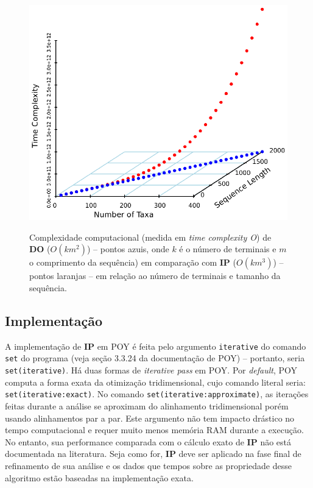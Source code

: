 \begin{refsection}
  \begin{figure}[H]
       \centering
      {\includegraphics[scale=0.9]{figures/tut11/complexity.eps}}
	{\caption[Complexidade computacional de \textbf{DO} em comparação com \textbf{IP}.]{Complexidade computacional (medida em \textit{time complexity O}) de \textbf{DO} ($O(km^2)$) -- pontos azuis, onde $k$ é o número de terminais e $m$ o comprimento da sequência) em comparação com \textbf{IP} ($O(km^3)$) -- pontos laranjas -- em relação ao número de terminais e tamanho da sequência.}\label{tut11:fig:complexity}}
  \end{figure}



\subsection{Implementação}\label{tut11:ip:implementation}

A implementação de \textbf{IP} em POY é feita pelo argumento \texttt{iterative} do comando \texttt{set} do programa (veja seção 3.3.24 da documentação de POY) -- portanto, seria \texttt{set(iterative)}. Há duas formas de \textit{iterative pass} em POY. Por \textit{default}, POY computa a forma exata da otimização tridimensional, cujo comando literal seria: \texttt{set(iterative:exact)}. No comando \texttt{set(iterative:approximate)}, as iterações feitas durante a análise se aproximam do alinhamento tridimensional porém usando alinhamentos par a par. Este argumento não tem impacto drástico no tempo computacional e requer muito menos memória RAM durante a execução. No entanto, sua performance comparada com o cálculo exato de \textbf{IP} não está documentada na literatura. Seja como for, \textbf{IP} deve ser aplicado na fase final de refinamento de sua análise e os dados que tempos sobre as propriedade desse algoritmo estão baseadas na implementação exata.


\end{refsection}
